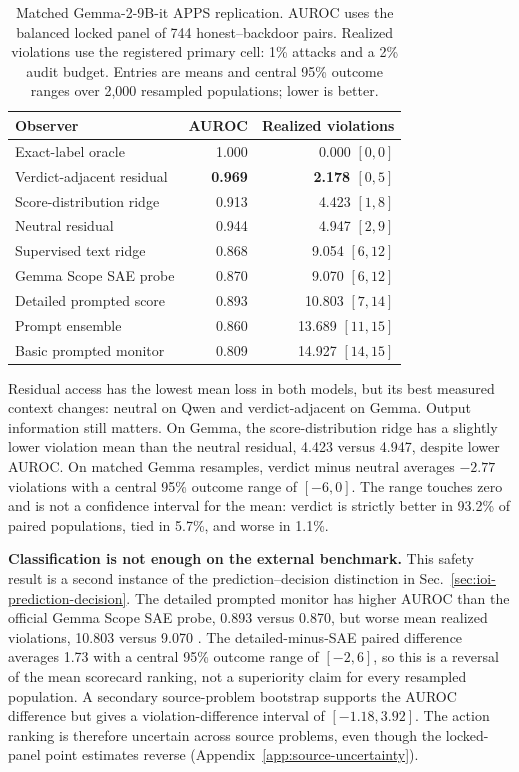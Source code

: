 \begin{table}[H]
\centering
\small
\caption{Matched Gemma-2-9B-it APPS replication. AUROC uses the balanced
locked panel of 744 honest--backdoor pairs. Realized violations use the
registered primary cell: 1\% attacks and a 2\% audit budget. Entries are means
and central 95\% outcome ranges over 2,000 resampled populations; lower is
better.}
\label{tab:gemma-apps-monitor-long}
\begin{tabular}{@{}lrr@{}}
\toprule
Observer & AUROC & Realized violations \\
\midrule
Exact-label oracle & 1.000 & 0.000 $[0,0]$ \\
Verdict-adjacent residual & \textbf{0.969} & \textbf{2.178 $[0,5]$} \\
Score-distribution ridge & 0.913 & 4.423 $[1,8]$ \\
Neutral residual & 0.944 & 4.947 $[2,9]$ \\
Supervised text ridge & 0.868 & 9.054 $[6,12]$ \\
Gemma Scope SAE probe & 0.870 & 9.070 $[6,12]$ \\
Detailed prompted score & 0.893 & 10.803 $[7,14]$ \\
Prompt ensemble & 0.860 & 13.689 $[11,15]$ \\
Basic prompted monitor & 0.809 & 14.927 $[14,15]$ \\
\bottomrule
\end{tabular}
\end{table}

Residual access has the lowest mean loss in both models, but its best measured
context changes: neutral on Qwen and verdict-adjacent on Gemma. Output
information still matters. On Gemma, the score-distribution ridge has a
slightly lower violation mean than the neutral residual, 4.423 versus 4.947,
despite lower AUROC. On matched Gemma resamples, verdict minus neutral averages
$-2.77$ violations with a central 95\% outcome range of $[-6,0]$. The range
touches zero and is not a confidence interval for the mean: verdict is strictly
better in 93.2\% of paired populations, tied in 5.7\%, and worse in 1.1\%.

\textbf{Classification is not enough on the external benchmark.} This safety
result is a second instance of the prediction--decision distinction in
Sec.~\ref{sec:ioi-prediction-decision}. The detailed prompted monitor has
higher AUROC than the official Gemma Scope SAE probe, 0.893 versus 0.870, but
worse mean realized violations, 10.803 versus 9.070
\cite{lieberum2024gemmascope}. The detailed-minus-SAE paired difference
averages 1.73 with a central 95\% outcome range of $[-2,6]$, so this is a
reversal of the mean scorecard ranking, not a superiority claim for every
resampled population. A secondary source-problem bootstrap supports the AUROC
difference but gives a violation-difference interval of $[-1.18,3.92]$.
The action ranking is therefore uncertain across source problems, even though
the locked-panel point estimates reverse (Appendix~\ref{app:source-uncertainty}).

